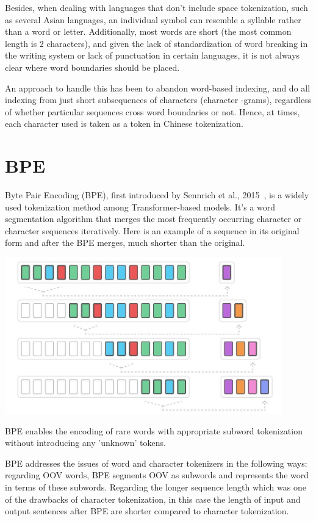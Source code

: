 Besides, when dealing with languages that don't include space tokenization, such as several Asian languages, an individual symbol can resemble a syllable rather than a word or letter. Additionally, most words are short (the most common length is 2 characters), and given the lack of standardization of word breaking in the writing system or lack of punctuation in certain languages, it is not always clear where word boundaries should be placed.

An approach to handle this has been to abandon word-based indexing, and do all indexing from just short subsequences of characters (character -grams), regardless of whether particular sequences cross word boundaries or not. Hence, at times, each character used is taken as a token in Chinese tokenization.

\section{BPE}

Byte Pair Encoding (BPE), first introduced by Sennrich et al., 2015~\cite{sennrich2015neural}, is a widely used tokenization method among Transformer-based models. It's a word segmentation algorithm that merges the most frequently occurring character or character sequences iteratively. Here is an example of a sequence in its original form and after the BPE merges, much shorter than the original.

\begin{center}
\includegraphics[width=12cm]{figures/bpe.jpg}
\end{center}

BPE enables the encoding of rare words with appropriate subword tokenization without introducing any 'unknown' tokens.

BPE addresses the issues of word and character tokenizers in the following ways: regarding OOV words, BPE segments OOV as subwords and represents the word in terms of these subwords. Regarding the longer sequence length which was one of the drawbacks of character tokenization, in this case the length of input and output sentences after BPE are shorter compared to character tokenization.


